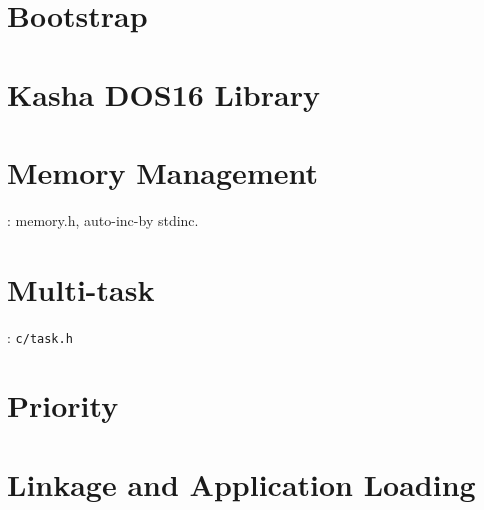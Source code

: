 

\section{Bootstrap}


\section{Kasha DOS16 Library}


\section{Memory Management}
: memory.h, auto-inc-by stdinc.

\section{Multi-task}
: \verb|c/task.h|

\section{Priority}






\section{Linkage and Application Loading}


